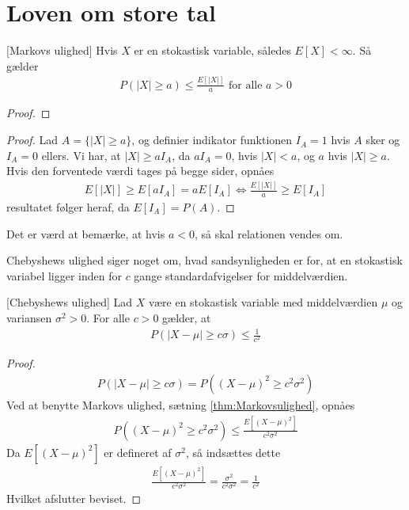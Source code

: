 \section{Loven om store tal}
\begin{theorem} \label{thm:Markovsulighed}[Markovs ulighed]
Hvis $X$ er en stokastisk variable, således
$E[X] < \infty$. Så gælder
\begin{align*}
    P(|X|\geq a) \leq \frac{E[|X|]}{a} \text{ for alle } a > 0
\end{align*}
\end{theorem}
\begin{proof}
\end{proof}
\begin{proof}
  Lad $A=\{|X|\geq a\}$, og definier indikator funktionen $I_A = 1$ hvis $A$ sker og $I_{A} = 0$ ellers. Vi har, at $|X| \geq aI_{A}$, da $aI_{A} = 0$, hvis $|X| < a$, og $a$ hvis $|X| \geq a$. Hvis den forventede værdi tages på begge sider, opnåes
  \begin{align*}
    E[|X|]\geq E[aI_A] = a E[I_A] \iff \frac{E[|X|]}{a}\geq E[I_A]
  \end{align*}
  resultatet følger heraf, da $E[I_{A}] = P(A)$.
\end{proof}
Det er værd at bemærke, at hvis $a<0$, så skal relationen vendes om.

Chebyshews ulighed siger noget om, hvad sandsynligheden er for, at en stokastisk variabel ligger inden for $c$ gange standardafvigelser for middelværdien.
\begin{theorem} \label{Thm:Chebyshewsulighed}[Chebyshews ulighed]
    Lad $X$ være en stokastisk variable med middelværdien $\mu$ og variansen $\sigma^2>0$. For alle $c>0$ gælder, at
    \begin{align*}
        P(|X-\mu|\geq c \sigma)\leq \frac{1}{c^2}
    \end{align*}
\end{theorem}
\begin{proof}%
    \begin{align*}
        P(|X-\mu|\geq c \sigma)=P((X-\mu)^2\geq c^2\sigma^2)
    \end{align*}
Ved at benytte Markovs ulighed, sætning \ref{thm:Markovsulighed}, opnåes
\begin{align*}
    P((X-\mu)^2\geq c^2\sigma^2) \leq \frac{E[(X-\mu)^2]}{c^2\sigma^2}
\end{align*}
Da $E[(X-\mu)^2]$ er defineret af $\sigma^2$, så indsættes dette
\begin{align*}
    \frac{E[(X-\mu)^2]}{c^2\sigma^2} = \frac{\sigma^2}{c^2\sigma^2} = \frac{1}{c^2}
\end{align*}
Hvilket afslutter beviset.
\end{proof}

